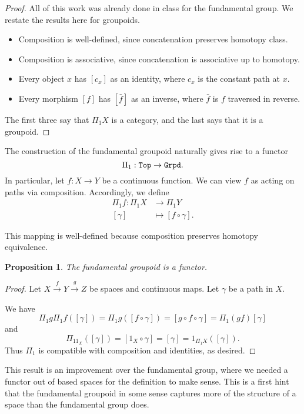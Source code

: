 \documentclass[11 pt]{amsart}
\theoremstyle{plain}   %
\newtheorem{prop}{Proposition}[section]
\theoremstyle{definition}
\theoremstyle{remark}
\numberwithin{equation}{section}
\newcommand{\cat}[1]{{\normalfont\texttt{#1}}}
\begin{document}
\begin{proof}
	All of this work was already done in class for the fundamental group. We
	restate the results here for groupoids.
	\begin{itemize}
		\item Composition is well-defined, since concatenation preserves homotopy
		      class.
		\item Composition is associative, since concatenation is associative up to
		      homotopy.
		\item Every object $x$ has $[c_x]$ as an identity, where $c_x$ is the
		      constant path at $x$.
		\item Every morphism $[f]$ has $[\bar{f}]$ as an inverse, where $\bar{f}$ is
		      $f$ traversed in reverse.
	\end{itemize}

	The first three say that $\Pi_1X$ is a category, and the last says that it
	is a groupoid.
\end{proof}

The construction of the fundamental groupoid naturally gives rise to a functor
$$\Pi_1: \cat{Top}\rightarrow\cat{Grpd}.$$ In particular, let $f: X\rightarrow
	Y$ be a continuous function. We can view $f$ as acting on paths via composition.
Accordingly, we define
\begin{align*}
	\Pi_1f  \colon \Pi_1X & \to \Pi_1Y              \\
	[\gamma]              & \mapsto [f\circ\gamma].
\end{align*}

This mapping is well-defined because composition preserves homotopy equivalence.

\begin{prop}\label{fundamental groupoid is a functor}
	The fundamental groupoid is a functor.
\end{prop}

\begin{proof}
	Let $X\xrightarrow{f}Y\xrightarrow{g}Z$ be spaces and continuous maps. Let
	$\gamma$ be a path in $X$.

	We have $$\Pi_1g\Pi_1f([\gamma]) = \Pi_1g([f\circ\gamma]) = [g\circ f\circ\gamma] = \Pi_1(gf)[\gamma]$$
	and $$\Pi_11_X([\gamma]) = [1_X\circ\gamma] = [\gamma] = 1_{\Pi_1X}([\gamma]).$$
	Thus $\Pi_1$ is compatible with composition and identities, as desired.\qedhere
\end{proof}

This result is an improvement over the fundamental group, where we needed a
functor out of based spaces for the definition to make sense. This is a first
hint that the fundamental groupoid in some sense captures more of the structure
of a space than the fundamental group does.
\end{document}
